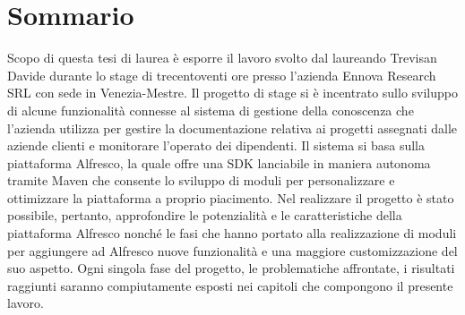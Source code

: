
\cleardoublepage
{}
{}
\begingroup
\let\clearpage\relax
\let\cleardoublepage\relax
\let\cleardoublepage\relax

\chapter*{Sommario}

Scopo di questa tesi di laurea è esporre il lavoro svolto dal laureando Trevisan Davide
durante lo stage di trecentoventi ore presso l’azienda Ennova Research SRL con sede in
Venezia-Mestre.
Il progetto di stage si è incentrato sullo sviluppo di alcune funzionalità connesse
al sistema di gestione della conoscenza che l’azienda utilizza per gestire la documentazione relativa ai progetti assegnati dalle aziende clienti e monitorare l’operato dei dipendenti. Il sistema si basa sulla piattaforma Alfresco, la quale offre una SDK lanciabile in maniera autonoma tramite Maven che consente lo sviluppo di moduli per personalizzare e ottimizzare la piattaforma a proprio piacimento. Nel realizzare il progetto è stato possibile, pertanto, approfondire le potenzialità e le caratteristiche della piattaforma Alfresco nonché le fasi che hanno portato alla realizzazione di moduli per aggiungere ad Alfresco nuove funzionalità e una maggiore customizzazione del suo aspetto.
Ogni singola fase del progetto, le problematiche affrontate, i risultati raggiunti saranno
compiutamente esposti nei capitoli che compongono il presente lavoro.

%
%

\endgroup			

\vfill

